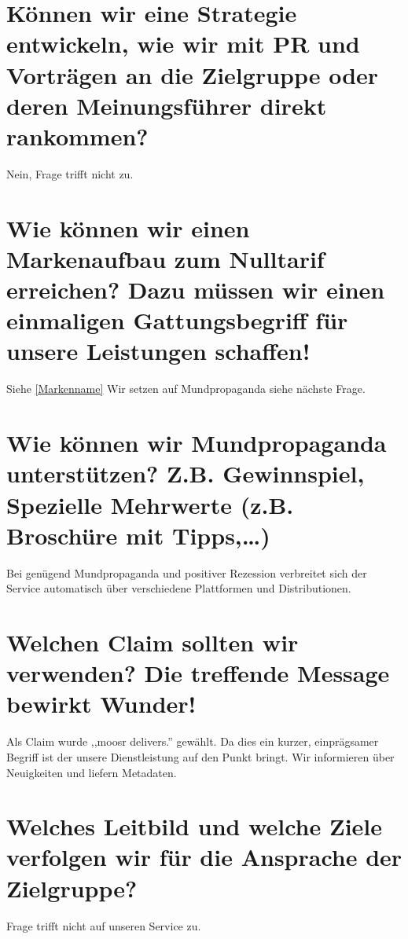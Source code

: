 \section{Können wir eine Strategie entwickeln, wie wir mit PR und Vorträgen an die Zielgruppe oder deren Meinungsführer direkt rankommen?}
Nein, Frage trifft nicht zu.

\section{Wie können wir einen Markenaufbau zum Nulltarif erreichen? Dazu müssen wir einen einmaligen Gattungsbegriff für unsere Leistungen schaffen!}
Siehe \ref{Markenname} 
Wir setzen auf Mundpropaganda siehe nächste Frage.

\section{Wie können wir Mundpropaganda unterstützen? Z.B. Gewinnspiel, Spezielle Mehrwerte (z.B. Broschüre mit Tipps,\dots)}
Bei genügend Mundpropaganda und positiver Rezession verbreitet sich der
Service automatisch über verschiedene Plattformen und Distributionen.

\label{claim}
\section{Welchen Claim sollten wir verwenden? Die treffende Message bewirkt Wunder!}
Als Claim wurde ,,moosr delivers.'' gewählt. Da dies ein kurzer, einprägsamer
Begriff ist der unsere Dienstleistung auf den Punkt bringt. Wir informieren über
Neuigkeiten und liefern Metadaten.

\section{Welches Leitbild und welche Ziele verfolgen wir für die Ansprache der Zielgruppe?}
Frage trifft nicht auf unseren Service zu.
